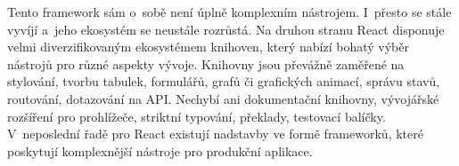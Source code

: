Tento framework sám o~sobě není úplně komplexním nástrojem. I~přesto se stále vyvíjí a~jeho ekosystém se neustále rozrůstá. 
Na druhou stranu React disponuje velmi diverzifikovaným ekosystémem knihoven, který nabízí bohatý výběr nástrojů pro různé aspekty vývoje. 
Knihovny jsou převážně zaměřené na stylování, tvorbu tabulek, formulářů, grafů či grafických animací, správu stavů, routování, dotazování na API. 
Nechybí ani dokumentační knihovny, vývojářské rozšíření pro prohlížeče, striktní typování, překlady, testovací balíčky. 
V~neposlední řadě pro React existují nadstavby ve formě frameworků, které poskytují komplexnější nástroje pro produkční aplikace.\cite{awesomereact,builderreacteco,react}